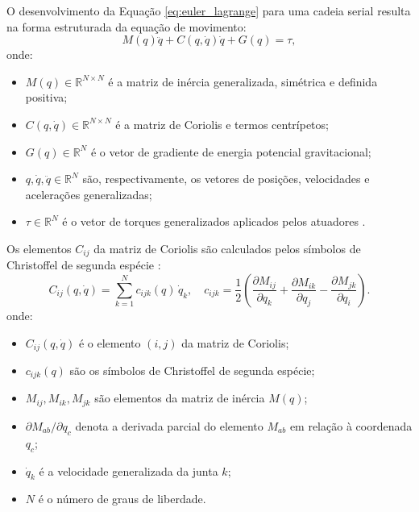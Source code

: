 O desenvolvimento da Equação \eqref{eq:euler_lagrange} para uma cadeia serial resulta na forma estruturada da equação de movimento:
\begin{equation}
    M(q)\ddot{q} + C(q,\dot{q})\dot{q} + G(q) = \tau,
    \label{eq:motion_equation}
\end{equation}
onde:
\begin{itemize}
    \item $M(q) \in \mathbb{R}^{N \times N}$ é a matriz de inércia generalizada, simétrica e definida positiva;
    \item $C(q,\dot{q}) \in \mathbb{R}^{N \times N}$ é a matriz de Coriolis e termos centrípetos;
    \item $G(q) \in \mathbb{R}^{N}$ é o vetor de gradiente de energia potencial gravitacional;
    \item $q, \dot{q}, \ddot{q} \in \mathbb{R}^{N}$ são, respectivamente, os vetores de posições, velocidades e acelerações generalizadas;
    \item $\tau \in \mathbb{R}^{N}$ é o vetor de torques generalizados aplicados pelos atuadores \cite{craig1989introduction, spong2020robot, siciliano2009robotics}.
\end{itemize}

Os elementos $C_{ij}$ da matriz de Coriolis são calculados pelos símbolos de Christoffel de segunda espécie \cite{spong2020robot}:
\begin{equation}
    C_{ij}(q,\dot{q}) = \sum_{k=1}^{N} c_{ijk}(q)\,\dot{q}_k, \quad
    c_{ijk} = \frac{1}{2}\left(\frac{\partial M_{ij}}{\partial q_k} + \frac{\partial M_{ik}}{\partial q_j} - \frac{\partial M_{jk}}{\partial q_i}\right).
    \label{eq:christoffel}
\end{equation}
onde:
\begin{itemize}
    \item $C_{ij}(q,\dot{q})$ é o elemento $(i,j)$ da matriz de Coriolis;
    \item $c_{ijk}(q)$ são os símbolos de Christoffel de segunda espécie;
    \item $M_{ij}, M_{ik}, M_{jk}$ são elementos da matriz de inércia $M(q)$;
    \item $\partial M_{ab}/\partial q_c$ denota a derivada parcial do elemento $M_{ab}$ em relação à coordenada $q_c$;
    \item $\dot{q}_k$ é a velocidade generalizada da junta $k$;
    \item $N$ é o número de graus de liberdade.
\end{itemize}

